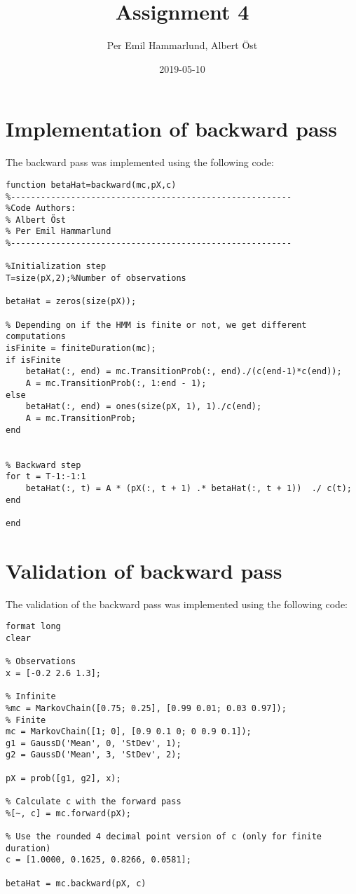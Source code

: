 \documentclass[]{article}
\title{Assignment 4}
\author{Per Emil Hammarlund, Albert Öst}
\date{2019-05-10}
\begin{document}
\maketitle

\tableofcontents

\newpage

\section{Implementation of backward
pass}\label{implementation-of-backward-pass}

The backward pass was implemented using the following code:

\begin{verbatim}
function betaHat=backward(mc,pX,c)
%--------------------------------------------------------
%Code Authors:
% Albert Öst
% Per Emil Hammarlund
%--------------------------------------------------------

%Initialization step
T=size(pX,2);%Number of observations

betaHat = zeros(size(pX));

% Depending on if the HMM is finite or not, we get different computations
isFinite = finiteDuration(mc);
if isFinite
    betaHat(:, end) = mc.TransitionProb(:, end)./(c(end-1)*c(end));
    A = mc.TransitionProb(:, 1:end - 1);
else
    betaHat(:, end) = ones(size(pX, 1), 1)./c(end);
    A = mc.TransitionProb;
end


% Backward step
for t = T-1:-1:1
    betaHat(:, t) = A * (pX(:, t + 1) .* betaHat(:, t + 1))  ./ c(t);
end

end
\end{verbatim}

\newpage

\section{Validation of backward pass}\label{validation-of-backward-pass}

The validation of the backward pass was implemented using the following
code:

\begin{verbatim}
format long
clear

% Observations
x = [-0.2 2.6 1.3];

% Infinite
%mc = MarkovChain([0.75; 0.25], [0.99 0.01; 0.03 0.97]);
% Finite
mc = MarkovChain([1; 0], [0.9 0.1 0; 0 0.9 0.1]);
g1 = GaussD('Mean', 0, 'StDev', 1);
g2 = GaussD('Mean', 3, 'StDev', 2);

pX = prob([g1, g2], x);

% Calculate c with the forward pass
%[~, c] = mc.forward(pX);

% Use the rounded 4 decimal point version of c (only for finite duration)
c = [1.0000, 0.1625, 0.8266, 0.0581];

betaHat = mc.backward(pX, c)
\end{verbatim}
\end{document}
